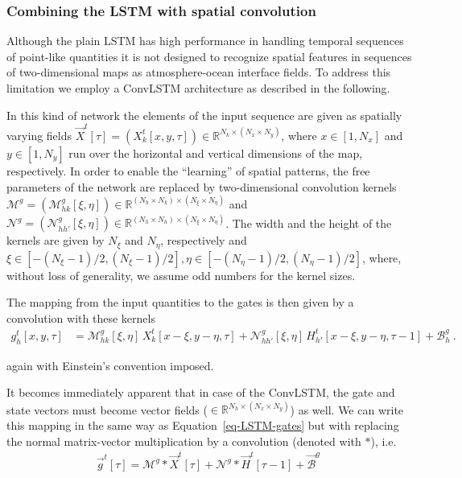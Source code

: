 \documentclass[
]{agujournal2019}
\begin{document}
\subsubsection{Combining the LSTM with spatial
convolution}\label{combining-the-lstm-with-spatial-convolution}

Although the plain LSTM has high performance in handling temporal
sequences of point-like quantities it is not designed to recognize
spatial features in sequences of two-dimensional maps as
atmosphere-ocean interface fields. To address this limitation we employ
a ConvLSTM architecture as described in the following.

In this kind of network the elements of the input sequence are given as
spatially varying fields
\(\vec{X}^t[\tau] = (X^t_k[x,y,\tau]) \in \mathbb{R}^{N_k \times (N_x \times N_y)}\),
where \(x\in[1, N_x]\) and \(y \in [1, N_y]\) run over the horizontal
and vertical dimensions of the map, respectively. In order to enable the
``learning'' of spatial patterns, the free parameters of the network are
replaced by two-dimensional convolution kernels
\(\pmb{\mathcal{M}}^{g} = (\mathcal{M}^{g}_{hk}[\xi, \eta]) \in \mathbb{R}^{(N_h \times N_k)\times (N_\xi \times N_\eta)}\)
and
\(\pmb{\mathcal{N}}^{g} = (\mathcal{N}^{g}_{hh'}[\xi, \eta]) \in \mathbb{R}^{(N_h \times N_h)\times (N_\xi \times N_\eta)}\).
The width and the height of the kernels are given by \(N_\xi\) and
\(N_\eta\), respectively and
\(\xi\in [-(N_\xi-1)/2,(N_\xi-1)/2], \eta\in [-(N_\eta-1)/2,(N_\eta-1)/2]\),
where, without loss of generality, we assume odd numbers for the kernel
sizes.

The mapping from the input quantities to the gates is then given by a
convolution with these kernels \[
\begin{aligned}
g^t_h[x,y,\tau] & =  \mathcal{M}^{g}_{hk} [\xi,\eta]\, X^t_k[x-\xi, y-\eta, \tau]  +  \mathcal{N}^{g}_{hh'}[\xi,\eta] \, H^t_{h'}[x-\xi, y-\eta, \tau-1] + \mathcal{B}^g_{h}\ .
\end{aligned}
\]

again with Einstein's convention imposed.

It becomes immediately apparent that in case of the ConvLSTM, the gate
and state vectors must become vector fields
(\(\in \mathbb{R}^{N_h \times (N_x \times N_y)}\)) as well. We can write
this mapping in the same way as Equation~\ref{eq-LSTM-gates} but with
replacing the normal matrix-vector multiplication by a convolution
(denoted with \(\ast\)), i.e.\\
\[
\begin{aligned}
\vec{g}^t[\tau] = \pmb{\mathcal{M}}^{g} \ast \vec{X}^t[\tau] + \pmb{\mathcal{N}}^{g} \ast  \vec{H}^t[ \tau-1]+ \vec{\mathcal{B}}^g \,
\end{aligned}
\]
\end{document}
